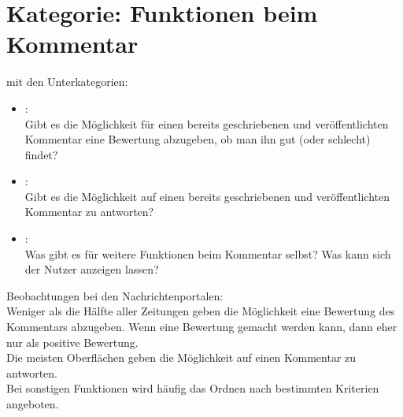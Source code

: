 \section{Kategorie: \glqq Funktionen beim Kommentar\grqq}

mit den Unterkategorien:
\begin{itemize}
\item{}\grqq:\\
Gibt es die Möglichkeit für einen bereits geschriebenen und veröffentlichten Kommentar eine Bewertung abzugeben, ob man ihn gut (oder schlecht) findet?

\item{}\grqq: \\
Gibt es die Möglichkeit auf einen bereits geschriebenen und veröffentlichten Kommentar zu antworten?


\item{}\grqq:\\
Was gibt es für weitere Funktionen beim Kommentar selbst? Was kann sich der Nutzer anzeigen lassen? 


\end{itemize}

Beobachtungen bei den Nachrichtenportalen:\\
Weniger als die Hälfte aller Zeitungen geben die Möglichkeit eine
Bewertung des Kommentars abzugeben. Wenn eine Bewertung gemacht werden kann,
dann eher nur als positive Bewertung.\\
Die meisten Oberflächen geben die Möglichkeit auf einen Kommentar
zu antworten. \\
Bei sonstigen Funktionen wird häufig das
Ordnen nach bestimmten Kriterien angeboten. 


